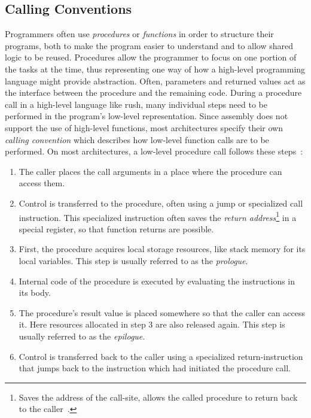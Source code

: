 \subsection{Calling Conventions}

Programmers often use \emph{procedures} or \emph{functions} in order to structure their programs,
both to make the program easier to understand and to allow shared logic to be reused.
Procedures allow the programmer to focus on one portion of the tasks at the time,
thus representing one way of how a high-level programming language might provide abstraction.
Often, parameters and returned values act as the interface between the procedure and the remaining code.
During a procedure call in a high-level language like rush, many individual steps need to be performed in the program's low-level representation.
Since assembly does not support the use of high-level functions, most architectures specify their own \emph{calling convention} which describes how low-level function calls are to be performed.
On most architectures, a low-level procedure call follows these steps~\cite[p.~98]{Patterson2017-zq}:

\begin{enumerate}
	\item The caller places the call arguments in a place where the procedure can access them.
	\item Control is transferred to the procedure, often using a jump or specialized call instruction.
	      This specialized instruction often saves the \emph{return address}\footnote{Saves the address of the call-site,
		      allows the called procedure to return back to the caller~\cite[p.~99]{Patterson2017-zq}.} in a special register, so that function returns are possible.
	\item First, the procedure acquires local storage resources, like stack memory for its local variables.
	      This step is usually referred to as the \emph{prologue}.
	\item Internal code of the procedure is executed by evaluating the instructions in its body.
	\item The procedure's result value is placed somewhere so that the caller can access it.
	      Here resources allocated in step 3 are also released again.
	      This step is usually referred to as the \emph{epilogue}.
	\item Control is transferred back to the caller using a specialized return-instruction
	      that jumps back to the instruction which had initiated the procedure call.
\end{enumerate}


